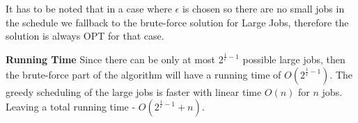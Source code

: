 It has to be noted that in a case where $ \epsilon $ is chosen so there are no small jobs in the schedule we fallback to the brute-force solution for Large Jobs, therefore the solution is always OPT for that case.

\textbf{Running Time}
Since there can be only at most $ 2^{\frac{1}{\epsilon}-1} $ possible large jobs, then the brute-force part of the algorithm will have a running time of $ O(2^{\frac{1}{\epsilon}-1}) $. The greedy scheduling of the large jobs is faster with linear time $ O(n) $ for $ n $ jobs. Leaving a total running time - $ O(2^{\frac{1}{\epsilon}-1} + n) $.

